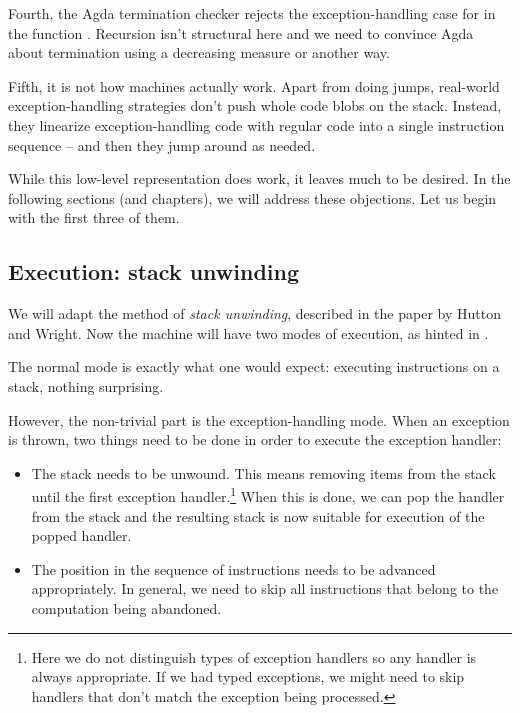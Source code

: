 Fourth, the Agda termination checker rejects the exception-handling case for
 in the function . Recursion isn't structural
here and we need to convince Agda about termination using a decreasing measure
or another way.

Fifth, it is not how machines actually work. Apart from doing jumps, real-world
exception-handling strategies don't push whole code blobs on the stack.
Instead, they linearize exception-handling code with regular code into a single
instruction sequence -- and then they jump around as needed.

While this low-level representation does work, it leaves much to be desired. In
the following sections (and chapters), we will address these objections. Let us
begin with the first three of them.

\subsection{Execution: stack unwinding}

We will adapt the method of \emph{stack unwinding}, described in the paper by Hutton
and Wright. Now the machine will have two modes of execution, as hinted in
\cite[p.~7]{gmh:exceptions}.

The normal mode is exactly what one would expect: executing instructions on a stack, nothing surprising.

However, the non-trivial part is the exception-handling mode. When an exception is thrown,
two things need to be done in order to execute the exception handler: \label{sec:stack-unwinding}
\begin{itemize}
	\item The stack needs to be unwound. This means removing items from the stack
		until the first exception handler.\footnote{Here we do not distinguish types
		of exception handlers so any handler is always appropriate. If we had typed
		exceptions, we might need to skip handlers that don't match the exception
		being processed.} When this is done, we can pop the handler from the stack
		and the resulting stack is now suitable for execution of the popped handler.
	\item The position in the sequence of instructions needs to be advanced
		appropriately. In general, we need to skip all instructions that belong
		to the computation being abandoned.
\end{itemize}

